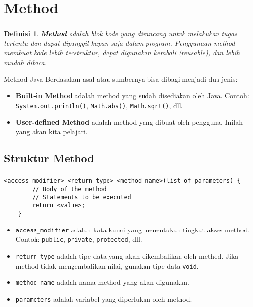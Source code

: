 \documentclass[aspectratio=169]{beamer}
\newtheorem*{definisi}{Definisi}
\theoremstyle{definition}
\begin{document}
    \section{Method}
    \begin{frame}
        \frametitle{\insertsection}
        \begin{definisi}
            \textbf{Method} adalah blok kode yang dirancang untuk melakukan tugas tertentu dan dapat dipanggil kapan saja dalam program. Penggunaan method membuat kode lebih terstruktur, dapat digunakan kembali (\textit{reusable}), dan lebih mudah dibaca.
        \end{definisi}
        \begin{block}{Method Java}
            Berdasakan asal atau sumbernya bisa dibagi menjadi dua jenis:
            \begin{itemize}[label=$\blacktriangleright$]
                \item \textbf{Built-in Method} adalah method yang sudah disediakan oleh Java. Contoh: \texttt{System.out.println()}, \texttt{Math.abs()}, \texttt{Math.sqrt()}, dll.
                \item \textbf{User-defined Method} adalah method yang dibuat oleh pengguna. Inilah yang akan kita pelajari.
            \end{itemize}
        \end{block}
    \end{frame}

    \subsection{Struktur Method}
    \begin{frame}[fragile]
        \frametitle{\insertsection}
        \framesubtitle{\insertsubsection}
        \begin{lstlisting}[caption={Struktur Method}]
    <access_modifier> <return_type> <method_name>(list_of_parameters) {
        // Body of the method
        // Statements to be executed
        return <value>;
    }
        \end{lstlisting}
        \begin{block}{}
            \begin{itemize}[label=$\blacktriangleright$]
                \item \texttt{access\_modifier} adalah kata kunci yang menentukan tingkat akses method. Contoh: \texttt{public}, \texttt{private}, \texttt{protected}, dll.
                \item \texttt{return\_type} adalah tipe data yang akan dikembalikan oleh method. Jika method tidak mengembalikan nilai, gunakan tipe data \texttt{void}.
                \item \texttt{method\_name} adalah nama method yang akan digunakan.
                \item \texttt{parameters} adalah variabel yang diperlukan oleh method.
            \end{itemize}
        \end{block}
    \end{frame}
\end{document}
